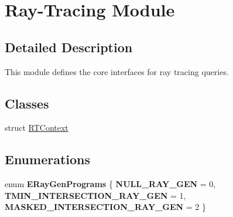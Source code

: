 \hypertarget{group___r_t_module}{}\section{Ray-\/\+Tracing Module}
\label{group___r_t_module}


\subsection{Detailed Description}
This module defines the core interfaces for ray tracing queries. \subsection*{Classes}
\begin{DoxyCompactItemize}
\item 
struct \hyperlink{struct_r_t_context}{R\+T\+Context}
\end{DoxyCompactItemize}
\subsection*{Enumerations}
\begin{DoxyCompactItemize}
\item 
\mbox{\label{group___r_t_module_gaac0f63836909c49162f207f4a91ffaf2}} 
enum {\bfseries E\+Ray\+Gen\+Programs} \{ {\bfseries N\+U\+L\+L\+\_\+\+R\+A\+Y\+\_\+\+G\+EN} = 0, 
{\bfseries T\+M\+I\+N\+\_\+\+I\+N\+T\+E\+R\+S\+E\+C\+T\+I\+O\+N\+\_\+\+R\+A\+Y\+\_\+\+G\+EN} = 1, 
{\bfseries M\+A\+S\+K\+E\+D\+\_\+\+I\+N\+T\+E\+R\+S\+E\+C\+T\+I\+O\+N\+\_\+\+R\+A\+Y\+\_\+\+G\+EN} = 2
 \}
\end{DoxyCompactItemize}

